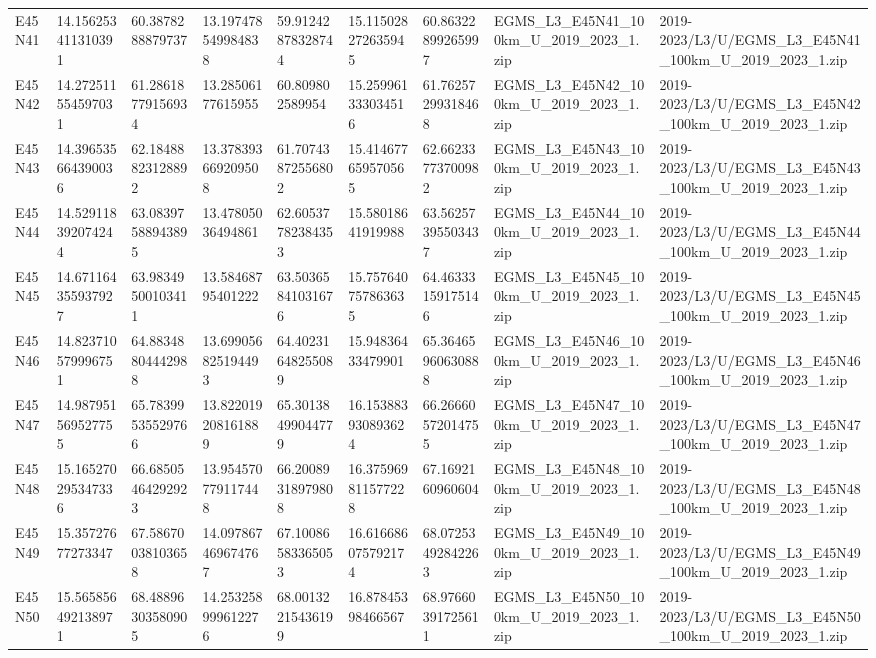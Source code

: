 \begin{landscape}
\begin{longtable}{lllllllll}
E45N41 & 14.156253411310391 & 60.3878288879737 & 13.197478549984838 & 59.91242878328744 & 15.115028272635945 & 60.86322899265997 & EGMS\_L3\_E45N41\_100km\_U\_2019\_2023\_1.zip & 2019-2023/L3/U/EGMS\_L3\_E45N41\_100km\_U\_2019\_2023\_1.zip \\
E45N42 & 14.272511554597031 & 61.28618779156934 & 13.28506177615955 & 60.809802589954 & 15.259961333034516 & 61.76257299318468 & EGMS\_L3\_E45N42\_100km\_U\_2019\_2023\_1.zip & 2019-2023/L3/U/EGMS\_L3\_E45N42\_100km\_U\_2019\_2023\_1.zip \\
E45N43 & 14.396535664390036 & 62.18488823128892 & 13.378393669209508 & 61.70743872556802 & 15.414677659570565 & 62.66233773700982 & EGMS\_L3\_E45N43\_100km\_U\_2019\_2023\_1.zip & 2019-2023/L3/U/EGMS\_L3\_E45N43\_100km\_U\_2019\_2023\_1.zip \\
E45N44 & 14.529118392074244 & 63.08397588943895 & 13.47805036494861 & 62.60537782384353 & 15.58018641919988 & 63.56257395503437 & EGMS\_L3\_E45N44\_100km\_U\_2019\_2023\_1.zip & 2019-2023/L3/U/EGMS\_L3\_E45N44\_100km\_U\_2019\_2023\_1.zip \\
E45N45 & 14.671164355937927 & 63.98349500103411 & 13.58468795401222 & 63.50365841031676 & 15.757640757863635 & 64.46333159175146 & EGMS\_L3\_E45N45\_100km\_U\_2019\_2023\_1.zip & 2019-2023/L3/U/EGMS\_L3\_E45N45\_100km\_U\_2019\_2023\_1.zip \\
E45N46 & 14.823710579996751 & 64.88348804442988 & 13.699056825194493 & 64.40231648255089 & 15.94836433479901 & 65.36465960630888 & EGMS\_L3\_E45N46\_100km\_U\_2019\_2023\_1.zip & 2019-2023/L3/U/EGMS\_L3\_E45N46\_100km\_U\_2019\_2023\_1.zip \\
E45N47 & 14.987951569527755 & 65.78399535529766 & 13.822019208161889 & 65.30138499044779 & 16.153883930893624 & 66.26660572014755 & EGMS\_L3\_E45N47\_100km\_U\_2019\_2023\_1.zip & 2019-2023/L3/U/EGMS\_L3\_E45N47\_100km\_U\_2019\_2023\_1.zip \\
E45N48 & 15.165270295347336 & 66.68505464292923 & 13.954570779117448 & 66.20089318979808 & 16.375969811577228 & 67.1692160960604 & EGMS\_L3\_E45N48\_100km\_U\_2019\_2023\_1.zip & 2019-2023/L3/U/EGMS\_L3\_E45N48\_100km\_U\_2019\_2023\_1.zip \\
E45N49 & 15.35727677273347 & 67.58670038103658 & 14.097867469674767 & 67.10086583365053 & 16.616686075792174 & 68.07253492842263 & EGMS\_L3\_E45N49\_100km\_U\_2019\_2023\_1.zip & 2019-2023/L3/U/EGMS\_L3\_E45N49\_100km\_U\_2019\_2023\_1.zip \\
E45N50 & 15.565856492138971 & 68.48896303580905 & 14.253258999612276 & 68.00132215436199 & 16.87845398466567 & 68.97660391725611 & EGMS\_L3\_E45N50\_100km\_U\_2019\_2023\_1.zip & 2019-2023/L3/U/EGMS\_L3\_E45N50\_100km\_U\_2019\_2023\_1.zip \\

\end{longtable}
\end{landscape}
